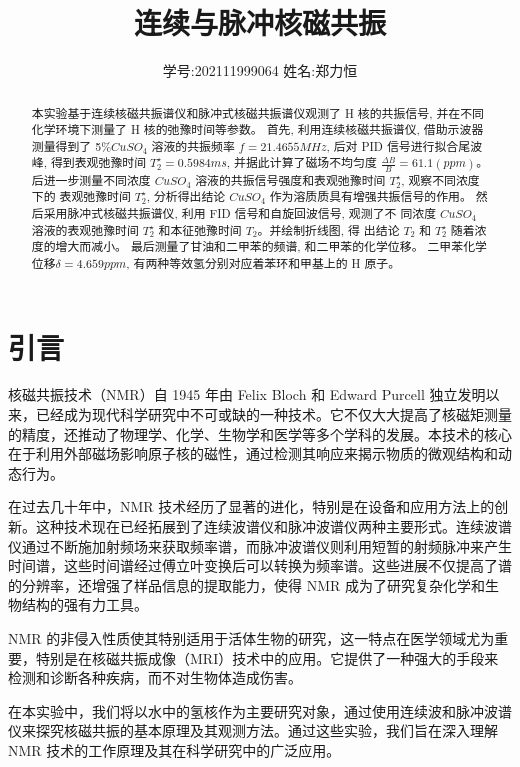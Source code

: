 \documentclass[12pt,a4paper]{article}
\title{\vspace{-4cm}\Large 连续与脉冲核磁共振}  %
\author{\kaishu 学号:202111999064 \hspace{2cm} 姓名:郑力恒}   %
\date{}
\begin{document}
\maketitle

\begin{abstract}
    本实验基于连续核磁共振谱仪和脉冲式核磁共振谱仪观测了 H 核的共振信号, 并在不同化学环境下测量了 H 核的弛豫时间等参数。
    首先, 利用连续核磁共振谱仪, 借助示波器测量得到了 5\%$CuS O_4$ 溶液的共振频率 $f = 21.4655 MHz$, 后对 PID 信号进行拟合尾波峰, 得到表观弛豫时间
    $T_2^{\star} = 0.5984ms$, 并据此计算了磁场不均匀度 $\frac{\Delta B}{B}= 61.1(ppm)$。
    后进一步测量不同浓度 $CuS O_4$ 溶液的共振信号强度和表观弛豫时间 $T_2^{\star}$, 观察不同浓度下的
    表观弛豫时间 $T_2^{\star}$, 分析得出结论 $CuS O_4$ 作为溶质质具有增强共振信号的作用。
    然后采用脉冲式核磁共振谱仪, 利用 FID 信号和自旋回波信号, 观测了不
    同浓度 $CuS O_4$ 溶液的表观弛豫时间 $T_2^{\star}$ 和本征弛豫时间 $T_2$。并绘制折线图, 得
    出结论 $T_2$ 和 $T_2^{\star}$ 随着浓度的增大而减小。
    最后测量了甘油和二甲苯的频谱, 和二甲苯的化学位移。 二甲苯化学位移$\delta =4.659ppm$, 有两种等效氢分别对应着苯环和甲基上的 H 原子。
\end{abstract}

\section{引言}
核磁共振技术（NMR）自 1945 年由 Felix Bloch 和 Edward Purcell 独立发明以来，已经成为现代科学研究中不可或缺的一种技术。它不仅大大提高了核磁矩测量的精度，还推动了物理学、化学、生物学和医学等多个学科的发展。本技术的核心在于利用外部磁场影响原子核的磁性，通过检测其响应来揭示物质的微观结构和动态行为。

在过去几十年中，NMR 技术经历了显著的进化，特别是在设备和应用方法上的创新。这种技术现在已经拓展到了连续波谱仪和脉冲波谱仪两种主要形式。连续波谱仪通过不断施加射频场来获取频率谱，而脉冲波谱仪则利用短暂的射频脉冲来产生时间谱，这些时间谱经过傅立叶变换后可以转换为频率谱。这些进展不仅提高了谱的分辨率，还增强了样品信息的提取能力，使得 NMR 成为了研究复杂化学和生物结构的强有力工具。

NMR 的非侵入性质使其特别适用于活体生物的研究，这一特点在医学领域尤为重要，特别是在核磁共振成像（MRI）技术中的应用。它提供了一种强大的手段来检测和诊断各种疾病，而不对生物体造成伤害。

在本实验中，我们将以水中的氢核作为主要研究对象，通过使用连续波和脉冲波谱仪来探究核磁共振的基本原理及其观测方法。通过这些实验，我们旨在深入理解 NMR 技术的工作原理及其在科学研究中的广泛应用。
\end{document}
